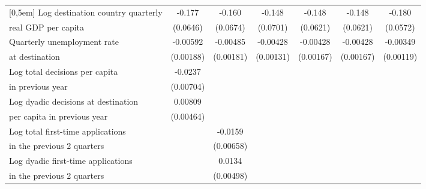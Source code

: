 \begin{table}[!ht]
\begin{tabular}{l*{6}{c}}
[0,5em]
Log destination country quarterly &      -0.177\sym{**} &      -0.160\sym{*}  &      -0.148\sym{*}  &      -0.148\sym{*}  &      -0.148\sym{*}  &      -0.180\sym{**} \\
real GDP per capita                    &    (0.0646)         &    (0.0674)         &    (0.0701)         &    (0.0621)         &    (0.0621)         &    (0.0572)         \\
[0,5em]
Quarterly unemployment rate &    -0.00592\sym{**} &    -0.00485\sym{**} &    -0.00428\sym{**} &    -0.00428\sym{*}  &    -0.00428\sym{*}  &    -0.00349\sym{**} \\
at destination                    &   (0.00188)         &   (0.00181)         &   (0.00131)         &   (0.00167)         &   (0.00167)         &   (0.00119)         \\
[0,5em]
Log total decisions per capita &     -0.0237\sym{**} &                     &                     &                     &                     &                     \\
in previous year                    &   (0.00704)         &                     &                     &                     &                     &                     \\
[0,5em]
Log dyadic decisions at destination &     0.00809         &                     &                     &                     &                     &                     \\
per capita in previous year                    &   (0.00464)         &                     &                     &                     &                     &                     \\
[0,5em]
Log total first-time applications &                     &     -0.0159\sym{*}  &                     &                     &                     &                     \\
in the previous 2 quarters                    &                     &   (0.00658)         &                     &                     &                     &                     \\
[0,5em]
Log dyadic first-time applications &                     &      0.0134\sym{**} &                     &                     &                     &                     \\
in the previous 2 quarters                    &                     &   (0.00498)         &                     &                     &                     &                     \\
[0,5em]

\end{tabular}
\end{table}
